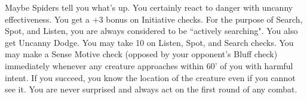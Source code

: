 \combatfeat
{Maybe Spiders tell you what's up. You certainly react to danger with uncanny effectiveness.}
{You get a +3 bonus on Initiative checks.}
{For the purpose of Search, Spot, and Listen, you are always considered to be ``actively searching". You also get Uncanny Dodge.}
{You may take 10 on Listen, Spot, and Search checks.}
{You may make a Sense Motive check (opposed by your opponent's Bluff check) immediately whenever any creature approaches within 60' of you with harmful intent. If you succeed, you know the location of the creature even if you cannot see it.}
{You are never surprised and always act on the first round of any combat.}